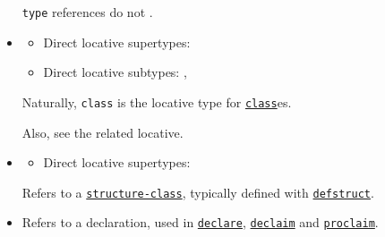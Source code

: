 \begin{itemize}
  \texttt{type} references do not
  .
\item
  \label{x-28CLASS-20MGL-PAX-3ALOCATIVE-29}

  \begin{itemize}
  \item
    Direct locative supertypes:
  \item
    Direct locative subtypes:
    ,
  \end{itemize}

  Naturally, \texttt{class} is the locative type for
  \href{http://www.lispworks.com/documentation/HyperSpec/Body/t_class.htm}{\texttt{class}}es.

  Also, see the related
  locative.
\item
  \label{x-28STRUCTURE-20MGL-PAX-3ALOCATIVE-29}

  \begin{itemize}
  \tightlist
  \item
    Direct locative supertypes:
  \end{itemize}

  Refers to a
  \href{http://www.lispworks.com/documentation/HyperSpec/Body/t_stu_cl.htm}{\texttt{structure-class}},
  typically defined with
  \href{http://www.lispworks.com/documentation/HyperSpec/Body/m_defstr.htm}{\texttt{defstruct}}.
\item
  \label{x-28DECLARATION-20MGL-PAX-3ALOCATIVE-29}

  Refers to a declaration, used in
  \href{http://www.lispworks.com/documentation/HyperSpec/Body/s_declar.htm}{\texttt{declare}},
  \href{http://www.lispworks.com/documentation/HyperSpec/Body/m_declai.htm}{\texttt{declaim}}
  and
  \href{http://www.lispworks.com/documentation/HyperSpec/Body/f_procla.htm}{\texttt{proclaim}}.


\end{itemize}
